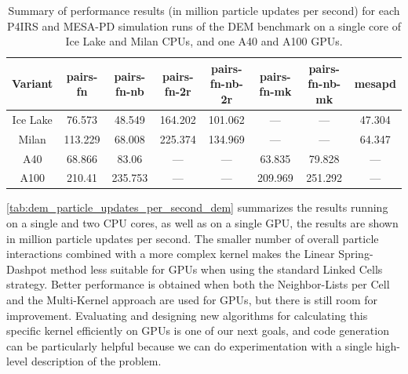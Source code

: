 \documentclass[Afour,sageh,times]{sagej}
\newcommand{\RMchange}[1]{{\color{blue} #1}}
\begin{document}
\begin{table}[htb]
    \centering
    \begin{tabular}{c|c|c|c|c|c|c|c}
        Variant & pairs-fn & pairs-fn-nb & pairs-fn-2r & pairs-fn-nb-2r & pairs-fn-mk & pairs-fn-nb-mk & mesapd \\
        \hline
        Ice Lake & 76.573 & 48.549 & 164.202 & 101.062 & --- & --- & 47.304 \\
        Milan & 113.229 & 68.008 & 225.374 & 134.969 & --- & --- & 64.347 \\
        A40 & 68.866 & 83.06 & --- & --- & 63.835 & 79.828 & --- \\
        A100 & 210.41 & 235.753 & --- & --- & 209.969 & 251.292 & --- \\
    \end{tabular}
    \caption{\RMchange{Summary of performance results (in million particle updates per second) for each P4IRS and MESA-PD simulation runs of the DEM benchmark on a single core of Ice Lake and Milan CPUs, and one A40 and A100 GPUs.}}
    \label{tab:dem_particle_updates_per_second_dem}
\end{table}

\RMchange{\autoref{tab:dem_particle_updates_per_second_dem} summarizes the results running on a single and two CPU cores, as well as on a single GPU, the results are shown in million particle updates per second.
The smaller number of overall particle interactions combined with a more complex kernel makes the Linear Spring-Dashpot method less suitable for GPUs when using the standard Linked Cells strategy.
Better performance is obtained when both the Neighbor-Lists per Cell and the Multi-Kernel approach are used for GPUs, but there is still room for improvement.
Evaluating and designing new algorithms for calculating this specific kernel efficiently on GPUs is one of our next goals, and code generation can be particularly helpful because we can do experimentation with a single high-level description of the problem.}
\end{document}
